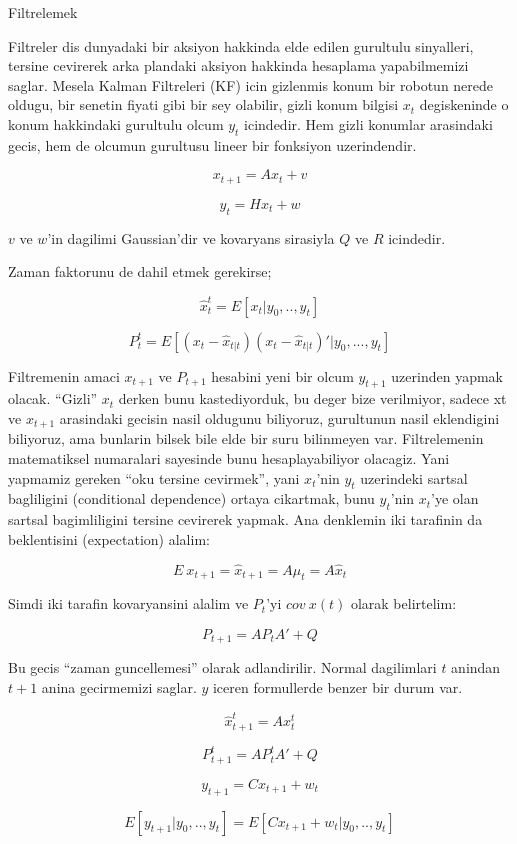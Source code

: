 \documentclass[12pt,fleqn]{article}\usepackage{../common}
\begin{document}
Filtrelemek

Filtreler dis dunyadaki bir aksiyon hakkinda elde edilen gurultulu
sinyalleri, tersine cevirerek arka plandaki aksiyon hakkinda hesaplama
yapabilmemizi saglar. Mesela Kalman Filtreleri (KF) icin gizlenmis konum
bir robotun nerede oldugu, bir senetin fiyati gibi bir sey olabilir, gizli
konum bilgisi $x_t$ degiskeninde o konum hakkindaki gurultulu olcum $y_t$
icindedir. Hem gizli konumlar arasindaki gecis, hem de olcumun gurultusu
lineer bir fonksiyon uzerindendir.

\[ x_{t+1} = Ax_t + v \]

\[ y_t = Hx_t + w \]

$v$ ve $w$'in dagilimi Gaussian'dir ve kovaryans sirasiyla $Q$ ve $R$
icindedir. 

Zaman faktorunu de dahil etmek gerekirse;

\[ \hat{x}_t^t = E[x_t|y_0,..,y_t] \]

\[ P_t^t = E[(x_t - \hat{x}_{t|t}) (x_t - \hat{x}_{t|t})'| y_0,...,y_t   ] \]

Filtremenin amaci $x_{t+1}$ ve $P_{t+1}$ hesabini yeni bir olcum $y_{t+1}$
uzerinden yapmak olacak. ``Gizli'' $x_t$ derken bunu kastediyorduk, bu
deger bize verilmiyor, sadece xt ve $x_{t+1}$ arasindaki gecisin nasil oldugunu
biliyoruz, gurultunun nasil eklendigini biliyoruz, ama bunlarin bilsek bile
elde bir suru bilinmeyen var. Filtrelemenin matematiksel numaralari
sayesinde bunu hesaplayabiliyor olacagiz.  Yani yapmamiz gereken ``oku
tersine cevirmek'', yani $x_t$'nin $y_t$ uzerindeki sartsal bagliligini
(conditional dependence) ortaya cikartmak, bunu $y_t$'nin $x_t$'ye olan sartsal
bagimliligini tersine cevirerek yapmak. Ana denklemin iki tarafinin da
beklentisini (expectation) alalim:

\[ E \ x_{t+1} = \hat{x}_{t+1} = A \mu_t = A \hat{x}_t \]

Simdi iki tarafin kovaryansini alalim ve $P_t$'yi $cov \ x(t)$ olarak
belirtelim:

\[ P_{t+1} = AP_tA' + Q \]

Bu gecis ``zaman guncellemesi'' olarak adlandirilir. Normal dagilimlari $t$
anindan $t + 1$ anina gecirmemizi saglar. $y$ iceren formullerde benzer bir
durum var. 

\[ \hat{x}_{t+1}^t = Ax_t^t \]

\[ P_{t+1}^t = AP_t^tA' + Q \]

\[ y_{t+1} = Cx_{t+1} + w_t \]

\[ E[y_{t+1}|y_0,..,y_t] = E[Cx_{t+1} + w_t | y_0,..,y_t] \]
\end{document}
